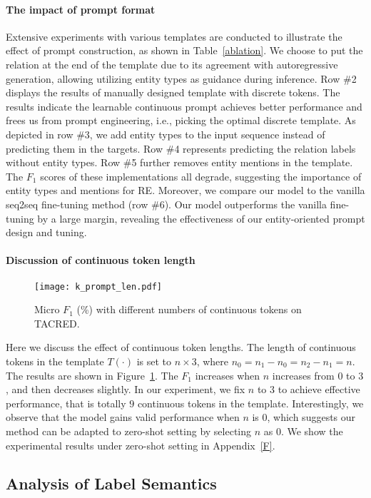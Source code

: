 \documentclass[11pt]{article}
\begin{document}
\paragraph{The impact of prompt format} 
Extensive experiments with various templates are conducted to illustrate the effect of prompt construction, as shown in Table~\ref{ablation}. We choose to put the relation at the end of the template due to its agreement with autoregressive generation, allowing utilizing entity types as guidance during inference.
Row \#2 displays the results of manually designed template with discrete tokens. 
The results indicate the learnable continuous prompt achieves better performance and frees us from prompt engineering, i.e., picking the optimal discrete template.
As depicted in row \#3, we add entity types to the input sequence instead of predicting them in the targets. Row \#4 represents predicting the relation labels without entity types. 
Row \#5 further removes entity mentions in the template. 
The $F_1$ scores of these implementations all degrade, suggesting the importance of entity types and mentions for RE. Moreover, we compare our model to the vanilla seq2seq fine-tuning method (row \#6). Our model outperforms the vanilla fine-tuning by a large margin, revealing the effectiveness of our entity-oriented prompt design and tuning.
\paragraph{Discussion of continuous token length}

\begin{figure}[t]
\centering
\texttt{[image: k\_prompt\_len.pdf]}
\caption{Micro $F_1$ (\%) with different numbers of continuous tokens on TACRED.}
\label{prompt_len} 
\end{figure}

Here we discuss the effect of continuous token lengths. The length of continuous tokens in the template $T(\cdot)$ is set to $n\times3$, where $n_0=n_1-n_0=n_2-n_1=n$. The results are shown in Figure~\ref{prompt_len}. The $F_1$ increases when $n$ increases from $0$ to $3$, and then decreases slightly. In our experiment, we fix $n$ to $3$ to achieve effective performance, that is totally $9$ continuous tokens in the template. Interestingly, we observe that the model gains valid performance when $n$ is 0, which suggests our method can be adapted to zero-shot setting by selecting $n$ as $0$. We show the experimental results under zero-shot setting in Appendix~\ref{F}.
\subsection{Analysis of Label Semantics}
\end{document}
